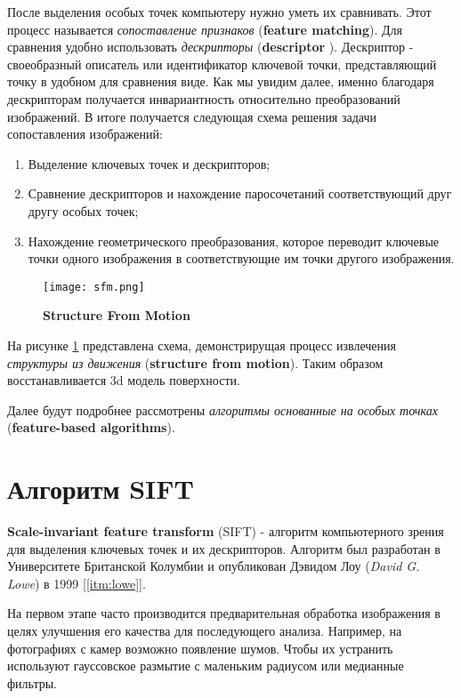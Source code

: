 После выделения особых точек компьютеру нужно уметь их сравнивать. Этот процесс называется \textit{сопоставление признаков} (\textbf{feature matching}). Для сравнения удобно использовать \textit{дескрипторы} (\textbf{descriptor} ). Дескриптор - своеобразный описатель или идентификатор ключевой точки, представляющий точку в удобном для сравнения виде. Как мы увидим далее, именно благодаря дескрипторам получается инвариантность относительно преобразований изображений. 
В итоге получается следующая схема решения задачи сопоставления изображений:

\begin{enumerate}
    \item Выделение ключевых точек и дескрипторов;
    \item Сравнение дескрипторов и нахождение паросочетаний соответствующий друг другу особых точек;
    \item Нахождение геометрического преобразования, которое переводит ключевые точки одного изображения в соответствующие им точки другого изображения.
\end{enumerate}

\begin{figure}[h]
    \centering
    \texttt{[image: sfm.png]}
    \caption{\textbf{Structure From Motion}}
    \label{fig:sfm}
\end{figure}

На рисунке \ref{fig:sfm} представлена схема, демонстрирущая процесс извлечения \textit{структуры из движения} (\textbf{structure from motion}). Таким образом восстанавливается 3d модель поверхности.

Далее будут подробнее рассмотрены \textit{алгоритмы основанные на особых точках} (\textbf{feature-based algorithms}).

\section{Алгоритм SIFT}   

\textbf{Scale-invariant feature transform} (SIFT) - алгоритм компьютерного зрения для выделения ключевых точек и их дескрипторов. Алгоритм был разработан в Университете Британской Колумбии и опубликован Дэвидом Лоу (\textit{David G. Lowe}) в 1999 \hyperref[itm:lowe]{[\ref{itm:lowe}]}.
    
На первом этапе часто производится предварительная обработка изображения в целях улучшения его качества для последующего анализа. Например, на фотографиях с камер возможно появление шумов. Чтобы их устранить используют гауссовское размытие с маленьким радиусом или медианные фильтры.

